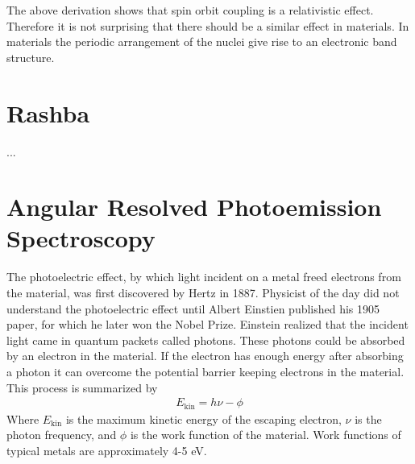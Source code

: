 \documentclass[12pt]{article}
\begin{document}
The above derivation shows that spin orbit coupling is a relativistic effect.
Therefore it is not surprising that there should be a similar effect in materials.
In materials the periodic arrangement of the nuclei give rise to an electronic band structure.

\section{Rashba}
...
\section{Angular Resolved Photoemission Spectroscopy}
The photoelectric effect, by which light incident on a metal freed electrons from the material, was first discovered by Hertz in 1887.
Physicist of the day did not understand the photoelectric effect until Albert Einstien published his 1905 paper, for which he later won the Nobel Prize.
Einstein realized that the incident light came in quantum packets called photons.
These photons could be absorbed by an electron in the material.
If the electron has enough energy after absorbing a photon it can overcome the potential barrier keeping electrons in the material.
This process is summarized by
\begin{align}
  E_{\text{kin}}=h\nu-\phi
\end{align}
Where $E_{\text{kin}}$ is the maximum kinetic energy of the escaping electron, $\nu$ is the photon frequency, and $\phi$ is the work function of the material.
Work functions of typical metals are approximately 4-5 eV.
\end{document}
